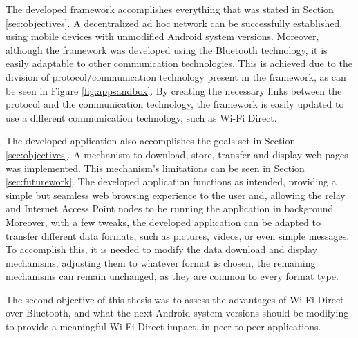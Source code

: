 The developed framework accomplishes everything that was stated in Section \ref{sec:objectives}. A decentralized ad hoc network can be successfully established, using mobile devices with unmodified Android system versions. Moreover, although the framework was developed using the Bluetooth technology, it is easily adaptable to other communication technologies. This is achieved due to the division of protocol/communication technology present in the framework, as can be seen in Figure \ref{fig:appsandbox}. By creating the necessary links between the protocol and the communication technology, the framework is easily updated to use a different communication technology, such as Wi-Fi Direct.

The developed application also accomplishes the goals set in Section \ref{sec:objectives}. A mechanism to download, store, transfer and display web pages was implemented. This mechanism's limitations can be seen in Section \ref{sec:futurework}. The developed application functions as intended, providing a simple but seamless web browsing experience to the user and, allowing the relay and Internet Access Point nodes to be running the application in background.  Moreover, with a few tweaks, the developed application can be adapted to transfer different data formats, such as pictures, videos, or even simple messages. To accomplish this, it is needed to modify the data download and display mechanisms, adjusting them to whatever format is chosen, the remaining mechanisms can remain unchanged, as they are common to every format type.

The second objective of this thesis was to assess the advantages of Wi-Fi Direct over Bluetooth, and what the next Android system versions should be modifying to provide a meaningful Wi-Fi Direct impact, in peer-to-peer applications. 





